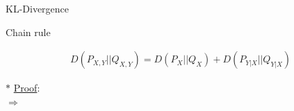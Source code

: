 \documentclass[9pt]{beamer}
\begin{document}
\begin{section}{KL-Divergence}
        \begin{frame}{Chain rule}
            \begin{theorem}
                \vspace{-0.4cm}
                \begin{align*} D(P_{X,Y}||Q_{X,Y}) = D(P_X||Q_X) + D(P_{Y|X} || Q_{Y|X})\end{align*}
            \end{theorem}
            \vspace{0.3cm}
            $\ast$ \underline{Proof}: 
            \\ $\Rightarrow$
            \vspace{3cm}
        \end{frame}

    \end{section}
\end{document}
